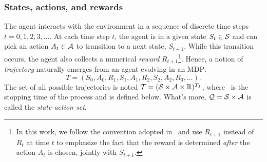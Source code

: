 			\subsubsection{States, actions, and rewards} 
				The agent interacts with the environment in a sequence of discrete time steps $t = 0, 1, 2, 3, \hdots$. At each time step $t$, the agent is in a given state $S_t \in \S$ and can pick an action $A_t \in \A$ to transition to a next state, $S_{t+1}$. While this transition occurs, the agent also collects a numerical \emph{reward} $R_{t+1}$\footnote{In this work, we follow the convention adopted in~\cite{sutton2018reinforcement} and use $R_{t+1}$ instead of $R_t$ at time $t$ to emphasize the fact that the reward is determined\emph{ after} the action $A_t$ is chosen, jointly with $S_{t+1}$.}. Hence, a notion of\emph{ trajectory} naturally emerges from an agent evolving in an MDP:
				\begin{equation*}
					T = (S_0, A_0, R_1, S_1, A_1, R_2, S_2, A_2, R_3, \hdots).
				\end{equation*}
				The set of all possible trajectories is noted $\T = (\S\times\A\times\R)^\Tf$, where \Tf~is the stopping time of the process and is defined below. What's more, $\Q = \S\times\A$ is called the\emph{ state-action set}.
